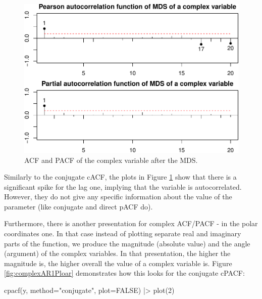 \documentclass[
]{book}
\newenvironment{Shaded}{\begin{snugshade}}{\end{snugshade}}
\newcommand{\AttributeTok}[1]{\textcolor[rgb]{0.77,0.63,0.00}{#1}}
\newcommand{\ConstantTok}[1]{\textcolor[rgb]{0.00,0.00,0.00}{#1}}
\newcommand{\DecValTok}[1]{\textcolor[rgb]{0.00,0.00,0.81}{#1}}
\newcommand{\FunctionTok}[1]{\textcolor[rgb]{0.00,0.00,0.00}{#1}}
\newcommand{\NormalTok}[1]{#1}
\newcommand{\SpecialCharTok}[1]{\textcolor[rgb]{0.00,0.00,0.00}{#1}}
\newcommand{\StringTok}[1]{\textcolor[rgb]{0.31,0.60,0.02}{#1}}
\begin{document}
\begin{figure}
\centering
\includegraphics{Svetunkov---Svetunkov---Complex-Valued-Econometrics_files/figure-latex/complexAR1Pearson-1.pdf}
\caption{\label{fig:complexAR1Pearson}ACF and PACF of the complex variable after the MDS.}
\end{figure}

Similarly to the conjugate cACF, the plots in Figure \ref{fig:complexAR1Pearson} show that there is a significant spike for the lag one, implying that the variable is autocorrelated. However, they do not give any specific information about the value of the parameter (like conjugate and direct pACF do).

Furthermore, there is another presentation for complex ACF/PACF - in the polar coordinates one. In that case instead of plotting separate real and imaginary parts of the function, we produce the magnitude (absolute value) and the angle (argument) of the complex variables. In that presentation, the higher the magnitude is, the higher overall the value of a complex variable is. Figure \ref{fig:complexAR1Ploar} demonstrates how this looks for the conjugate cPACF:

\begin{Shaded}
\begin{Highlighting}[]
\FunctionTok{cpacf}\NormalTok{(y, }\AttributeTok{method=}\StringTok{"conjugate"}\NormalTok{, }\AttributeTok{plot=}\ConstantTok{FALSE}\NormalTok{) }\SpecialCharTok{|\textgreater{}}
    \FunctionTok{plot}\NormalTok{(}\DecValTok{2}\NormalTok{)}
\end{Highlighting}
\end{Shaded}
\end{document}
